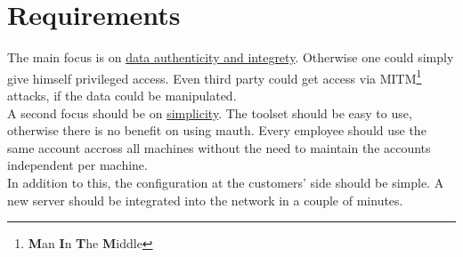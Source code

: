 %
%
%
%
%
%
%


\section{Requirements}

The main focus is on \ul{data authenticity and integrety}. Otherwise one could
simply give himself privileged access. Even third party could get access via
MITM\footnote{\textbf{M}an \textbf{I}n \textbf{T}he \textbf{M}iddle} attacks, if
the data could be manipulated. \\

A second focus should be on \ul{simplicity}. The toolset should be easy to use,
otherwise there is no benefit on using mauth. Every employee should use the same
account accross all machines without the need to maintain the accounts
independent per machine. \\

In addition to this, the configuration at the customers' side should be simple.
A new server should be integrated into the network in a couple of minutes.
